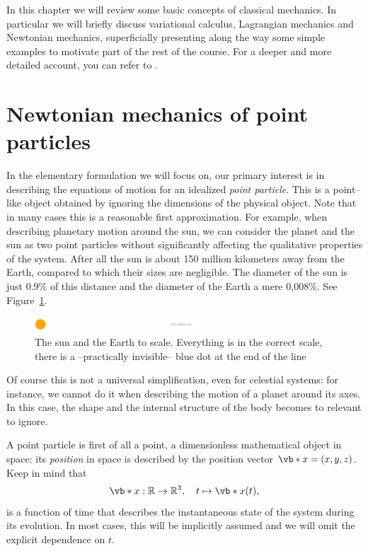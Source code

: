 \documentclass[english,fontsize=11pt,paper=b5]{scrbook}
\theoremstyle{definition}
\newcommand{\emphidx}[1]{\index{#1}\emph{#1}}
\begin{document}
  In this chapter we will review some basic concepts of classical mechanics.
  In particular we will briefly discuss variational calculus, Lagrangian mechanics and Newtonian mechanics, superficially presenting along the way some simple examples to motivate part of the rest of the course.
  For a deeper and more detailed account, you can refer to \cite{book:arnold,book:knauf}.

  \section{Newtonian mechanics of point particles}

  In the elementary formulation we will focus on, our primary interest is in describing the equations of motion for an idealized \emphidx{point particle}.
  This is a point--like object obtained by ignoring the dimensions of the physical object.
  Note that in many cases this is a reasonable first approximation.
  For example, when describing planetary motion around the sun, we can consider the planet and the sun as two point particles without significantly affecting the qualitative properties of the system.
  After all the sun is about 150 million kilometers away from the Earth, compared to which their sizes are negligible.
  The diameter of the sun is just 0.9\% of this distance and the diameter of the Earth a mere 0,008\%. See Figure~\ref{fig:sun-earth-scale}.
  \begin{figure}
    \centering
    \includegraphics[width=.9\linewidth]{images/sun-earth-scale.pdf}
    \caption{The sun and the Earth to scale. Everything is in the correct scale, there is a --practically invisible-- blue dot at the end of the line}\label{fig:sun-earth-scale}%
  \end{figure}
  Of course this is not a universal simplification, even for celestial systems: for instance, we cannot do it when describing the motion of a planet around its axes.
  In this case, the shape and the internal structure of the body becomes to relevant to ignore.

   A point particle is first of all a point, a dimensionless mathematical object in space: its \emphidx{position} in space is described by the position vector $\vb*{x} = (x, y ,z)$.
   Keep in mind that
  \begin{equation}
    \vb*{x} : \mathbb{R}\to\mathbb{R}^3,\quad t \mapsto \vb*{x}(t),
  \end{equation}
  is a function of time that describes the instantaneous state of the system during its evolution.
  In most cases, this will be implicitly assumed and we will omit the explicit dependence on $t$.
\end{document}
